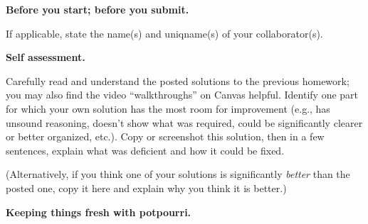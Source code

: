 \documentclass[11pt,addpoints]{exam}
\begin{document}
\hwpreface

\pointsinmargin
{}
\marginpointname{ \points}
\marginbonuspointname{ \bonuspoints}

\begin{questions}
  \addtocounter{question}{-1}
  \question[0] \textbf{Before you start; before you submit.}
  
  If applicable, state the name(s) and uniqname(s) of your collaborator(s).

  \begin{solution}

  \end{solution}

  \question[10] \textbf{Self assessment.}
  
  Carefully read and understand the posted solutions to the previous homework; you may also find the video ``walkthroughs'' on Canvas helpful.
  Identify one part for which your own solution has the most room for improvement (e.g., has unsound reasoning, doesn’t show what was required, could be significantly clearer or better organized, etc.).
  Copy or screenshot this solution, then in a few sentences, explain what was deficient and how it could be fixed.

  (Alternatively, if you think one of your solutions is significantly \emph{better} than the posted one, copy it here and explain why you think it is better.)

  \begin{solution}
    
  \end{solution}

  \question \textbf{Keeping things fresh with potpourri.}
  
\end{questions}
\end{document}
